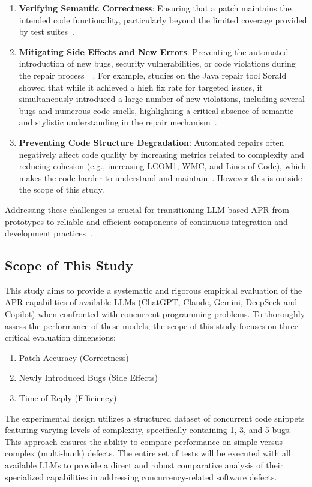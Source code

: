 \begin{enumerate}
    \item \textbf{Verifying Semantic Correctness}: Ensuring that a patch maintains the intended code functionality, particularly beyond the limited coverage provided by test suites~\cite{yang2025}.
    \item \textbf{Mitigating Side Effects and New Errors}: Preventing the automated introduction of new bugs, security vulnerabilities, or code violations during the repair process~\cite{yang2025}~\cite{liyanage2025}. For example, studies on the Java repair tool Sorald showed that while it achieved a high fix rate for targeted issues, it simultaneously introduced a large number of new violations, including several bugs and numerous code smells, highlighting a critical absence of semantic and stylistic understanding in the repair mechanism~\cite{liyanage2025}.
    \item \textbf{Preventing Code Structure Degradation}: Automated repairs often negatively affect code quality by increasing metrics related to complexity and reducing cohesion (e.g., increasing LCOM1, WMC, and Lines of Code), which makes the code harder to understand and maintain~\cite{liyanage2025}. However this is outside the scope of this study.
\end{enumerate}

Addressing these challenges is crucial for transitioning LLM-based APR from prototypes to reliable and efficient components of continuous integration and development practices~\cite{yang2025}.

\subsection{Scope of This Study}
This study aims to provide a systematic and rigorous empirical evaluation of the APR capabilities of available LLMs (ChatGPT, Claude, Gemini, DeepSeek and Copilot) when confronted with concurrent programming problems.
To thoroughly assess the performance of these models, the scope of this study focuses on three critical evaluation dimensions: 
\begin{enumerate}
    \item Patch Accuracy (Correctness)
    \item Newly Introduced Bugs (Side Effects)
    \item Time of Reply (Efficiency) 
\end{enumerate}
The experimental design utilizes a structured dataset of concurrent code snippets featuring varying levels of complexity, specifically containing 1, 3, and 5 bugs. This approach ensures the ability to compare performance on simple versus complex (multi-hunk) defects. The entire set of tests will be executed with all available LLMs to provide a direct and robust comparative analysis of their specialized capabilities in addressing concurrency-related software defects.
